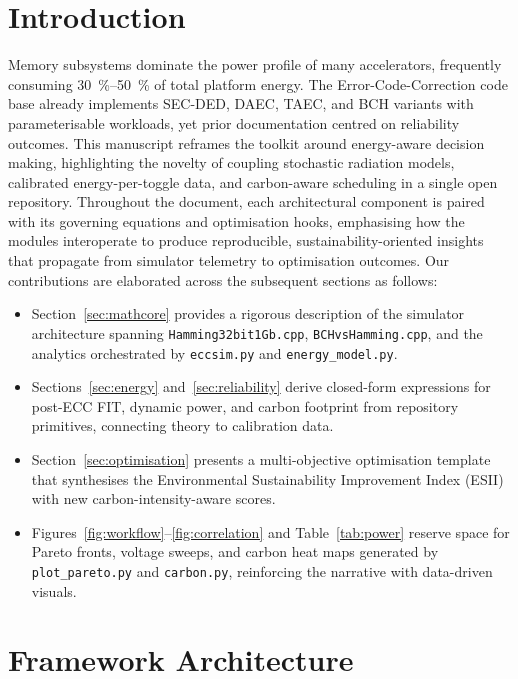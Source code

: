 \documentclass[conference]{IEEEtran}
\begin{document}
\section{Introduction}
Memory subsystems dominate the power profile of many accelerators, frequently consuming \SIrange{30}{50}{\percent} of total platform energy.
The Error-Code-Correction code base already implements SEC-DED, DAEC, TAEC, and BCH variants with parameterisable workloads, yet prior documentation centred on reliability outcomes.
This manuscript reframes the toolkit around energy-aware decision making, highlighting the novelty of coupling stochastic radiation models, calibrated energy-per-toggle data, and carbon-aware scheduling in a single open repository.
Throughout the document, each architectural component is paired with its governing equations and optimisation hooks, emphasising how the modules interoperate to produce reproducible, sustainability-oriented insights that propagate from simulator telemetry to optimisation outcomes.
Our contributions are elaborated across the subsequent sections as follows:
\begin{itemize}
    \item Section~\ref{sec:mathcore} provides a rigorous description of the simulator architecture spanning \texttt{Hamming32bit1Gb.cpp}, \texttt{BCHvsHamming.cpp}, and the analytics orchestrated by \texttt{eccsim.py} and \texttt{energy\_model.py}.
    \item Sections~\ref{sec:energy} and~\ref{sec:reliability} derive closed-form expressions for post-ECC FIT, dynamic power, and carbon footprint from repository primitives, connecting theory to calibration data.
    \item Section~\ref{sec:optimisation} presents a multi-objective optimisation template that synthesises the Environmental Sustainability Improvement Index (ESII) with new carbon-intensity-aware scores.
    \item Figures~\ref{fig:workflow}--\ref{fig:correlation} and Table~\ref{tab:power} reserve space for Pareto fronts, voltage sweeps, and carbon heat maps generated by \texttt{plot\_pareto.py} and \texttt{carbon.py}, reinforcing the narrative with data-driven visuals.
\end{itemize}

\section{Framework Architecture}
\end{document}
